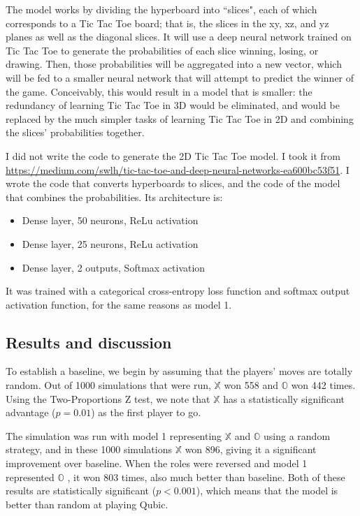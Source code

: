 \documentclass[11pt]{article}
\newcommand{\XX}{$\mathbb{X}$ }
\newcommand{\OO}{$\mathbb{O}$ }
\begin{document}
The model works by dividing the hyperboard into ``slices", each of which  corresponds to a Tic Tac Toe board; that is, the slices in the xy, xz, and yz planes as well as the diagonal slices. It will use a deep neural network trained on Tic Tac Toe to generate the probabilities of each slice winning, losing, or drawing. Then, those probabilities will be aggregated into a new vector, which will be fed to a smaller neural network that will attempt to predict the winner of the game. Conceivably, this would result in a model that is smaller: the redundancy of learning Tic Tac Toe in 3D would be eliminated, and would be replaced by the much simpler tasks of learning Tic Tac Toe in 2D and combining the slices' probabilities together.

I did not write the code to generate the 2D Tic Tac Toe model. I took it from \url{https://medium.com/swlh/tic-tac-toe-and-deep-neural-networks-ea600bc53f51}. I wrote the code that converts hyperboards to slices, and the code of the model that combines the probabilities. Its architecture is:
\begin{itemize}
    \item Dense layer, 50 neurons, ReLu activation
    \item Dense layer, 25 neurons, ReLu activation
    \item Dense layer, 2 outputs, Softmax activation
\end{itemize}

It was trained with a categorical cross-entropy loss function and softmax output activation function, for the same reasons as model 1.

\subsection{Results and discussion}
To establish a baseline, we begin by assuming that the players' moves are totally random. Out of 1000 simulations that were run, \XX won 558 and \OO won 442 times. Using the Two-Proportions Z test, we note that \XX has a statistically significant advantage ($p = 0.01$) as the first player to go.

The simulation was run with model 1 representing \XX and \OO using a random strategy, and in these 1000 simulations \XX won 896, giving it a significant improvement over baseline. When the roles were reversed and model 1 represented \OO, it won 803 times, also much better than baseline. Both of these results are statistically significant ($p < 0.001$), which means that the model is better than random at playing Qubic.
\end{document}
